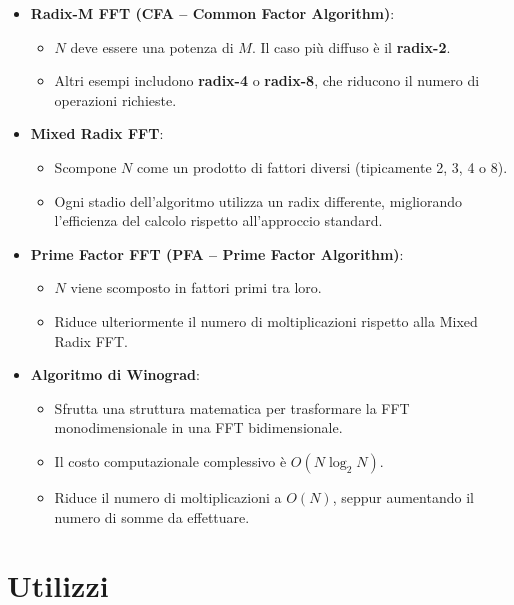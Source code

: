 \begin{itemize}
    \item \textbf{Radix-M FFT (CFA – Common Factor Algorithm)}:
    \begin{itemize}
        \item $N$ deve essere una potenza di $M$. Il caso più diffuso è il \textbf{radix-2}.
        \item Altri esempi includono \textbf{radix-4} o \textbf{radix-8}, che riducono il numero di operazioni richieste.
    \end{itemize}

    \item \textbf{Mixed Radix FFT}:
    \begin{itemize}
        \item Scompone $N$ come un prodotto di fattori diversi (tipicamente 2, 3, 4 o 8).
        \item Ogni stadio dell'algoritmo utilizza un radix differente, migliorando l’efficienza del calcolo rispetto all’approccio standard.
    \end{itemize}

    \item \textbf{Prime Factor FFT (PFA – Prime Factor Algorithm)}:
    \begin{itemize}
        \item $N$ viene scomposto in fattori primi tra loro.
        \item Riduce ulteriormente il numero di moltiplicazioni rispetto alla Mixed Radix FFT.
    \end{itemize}

    \item \textbf{Algoritmo di Winograd}:
    \begin{itemize}
        \item Sfrutta una struttura matematica per trasformare la FFT monodimensionale in una FFT bidimensionale.
        \item Il costo computazionale complessivo è $O(N \log_2 N)$.
        \item Riduce il numero di moltiplicazioni a $O(N)$, seppur aumentando il numero di somme da effettuare.
    \end{itemize}
\end{itemize}

\section*{Utilizzi}

